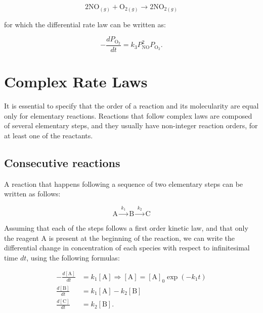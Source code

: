\documentclass[
  9pt,
]{extbook}
\theoremstyle{definition}
\theoremstyle{definition}
\theoremstyle{definition}
\theoremstyle{remark}
\begin{document}
\begin{equation}
2\text{NO}_{(g)}+\text{O}_{2(g)}\longrightarrow 2\text{NO}_{2(g)}
\end{equation}

for which the differential rate law can be written as:

\begin{equation}
-\frac{dP_{\mathrm{O}_2}}{dt}=k_3 P_{\mathrm{NO}}^2 P_{\mathrm{O}_2}.
\label{eq:kin17}
\end{equation}

\hypertarget{complex-rate-laws}{%
\section{Complex Rate Laws}\label{complex-rate-laws}}

It is essential to specify that the order of a reaction and its molecularity are equal only for elementary reactions. Reactions that follow complex laws are composed of several elementary steps, and they usually have non-integer reaction orders, for at least one of the reactants.

\hypertarget{consecutive-reactions}{%
\subsection{Consecutive reactions}\label{consecutive-reactions}}

A reaction that happens following a sequence of two elementary steps can be written as follows:

\begin{equation}
\text{A}\xrightarrow{\;k_1\;}\text{B}\xrightarrow{\;k_2\;}\text{C}
\end{equation}

Assuming that each of the steps follows a first order kinetic law, and that only the reagent \(\mathrm{A}\) is present at the beginning of the reaction, we can write the differential change in concentration of each species with respect to infinitesimal time \(dt\), using the following formulas:

\begin{equation}
\begin{aligned}
-\frac{d[\mathrm{A}]}{dt}&=k_1 [\mathrm{A}] \Rightarrow [\mathrm{A}] = [\mathrm{A}]_0 \exp(-k_1 t) \\
\frac{d[\mathrm{B}]}{dt} &=k_1 [\mathrm{A}]-k_2 [\mathrm{B}] \\
\frac{d[\mathrm{C}]}{dt} &=k_2 [\mathrm{B}].
\end{aligned}
\label{eq:kincomp2}
\end{equation}
\end{document}

